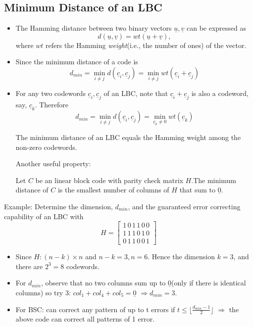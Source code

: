 \documentclass[12pt]{article}
\begin{document}
\subsection{Minimum Distance of an LBC}
\begin{itemize}
    \item The Hamming distance between two binary vectors $\underline{u},\underline{v}$ can be expressed as 
    \[
    d(\underline{u},\underline{v}) = wt(\underline{u}+\underline{v}),
    \]
    where $wt$ refers the Hamming \textit{weight}(i.e., the number of ones) of the vector.
    \item Since the minimum distance of a code is 
    \[
    d_{min} = \min_{i\not = j} d(\underline{c}_i,\underline{c}_j) = \min_{i\not = j} wt(\underline{c}_i + \underline{c}_j)
    \]
    \item For any two codewords $\underline{c}_i,\underline{c}_j$  of an LBC, note that $\underline{c}_i + \underline{c}_j$ is also a codeword, say, $\underline{c}_k$. Therefore 
    \[
    d_{min} = \min_{i\not = j} d(\underline{c}_i,\underline{c}_j) = \min_{\underline{c}_k\not = 0} wt(\underline{c}_k)
    \]
    \begin{center}
        The minimum distance of an LBC equals the Hamming weight among the non-zero codewords.
    \end{center}
    Another useful property:
    \begin{center}
        Let $C$ be an linear block code with parity check matrix $H$.The minimum distance of $C$ is the smallest number of columns of $H$ that sum to $\underline{0}$.
    \end{center}
\end{itemize}

    Example: Determine the dimension, $d_{min}$, and the guaranteed error correcting capability of an LBC with
    \[
    H =\begin{bmatrix}
    1\,0\,1\,1\,0\,0\\
    1\,1\,1\,0\,1\,0\\
    0\,1\,1\,0\,0\,1
    \end{bmatrix}
    \]
    \begin{itemize}
    \item Since $H:(n-k)\times n$ and $n-k=3, n=6$. Hence the dimension $k=3$, and there are $2^3=8$ codewords.
    \item For $d_{min}$, observe that no two columns sum up to $\underline{0}$(only if there is identical columns) so try 3: $col_1 + col_4 + col_5=\underline{0}$ $\Rightarrow d_{min}=3$.
    \item For BSC: can correct any pattern of up to t errors if $t\le \lfloor\frac{d_{min}-1}{2}\rfloor$ $\Rightarrow$ the above code can correct all patterns of 1 error.
    \end{itemize}
\end{document}
